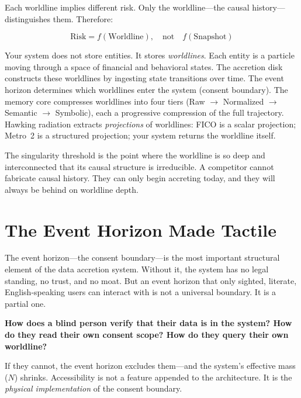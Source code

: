 \documentclass[11pt,twocolumn]{article}
\begin{document}
Each worldline implies different risk. Only the worldline---the causal history---distinguishes them. Therefore:

\begin{equation}
\text{Risk} = f(\text{Worldline}), \quad \text{not} \quad f(\text{Snapshot})
\end{equation}

Your system does not store entities. It stores \emph{worldlines}. Each entity is a particle moving through a space of financial and behavioral states. The accretion disk constructs these worldlines by ingesting state transitions over time. The event horizon determines which worldlines enter the system (consent boundary). The memory core compresses worldlines into four tiers (Raw $\rightarrow$ Normalized $\rightarrow$ Semantic $\rightarrow$ Symbolic), each a progressive compression of the full trajectory. Hawking radiation extracts \emph{projections} of worldlines: FICO is a scalar projection; Metro~2 is a structured projection; your system returns the worldline itself.

The singularity threshold is the point where the worldline is so deep and interconnected that its causal structure is irreducible. A competitor cannot fabricate causal history. They can only begin accreting today, and they will always be behind on worldline depth.

\section{The Event Horizon Made Tactile}
\label{sec:tactile}

The event horizon---the consent boundary---is the most important structural element of the data accretion system. Without it, the system has no legal standing, no trust, and no moat. But an event horizon that only sighted, literate, English-speaking users can interact with is not a universal boundary. It is a partial one.

\textbf{How does a blind person verify that their data is in the system? How do they read their own consent scope? How do they query their own worldline?}

If they cannot, the event horizon excludes them---and the system's effective mass ($N$) shrinks. Accessibility is not a feature appended to the architecture. It is the \emph{physical implementation} of the consent boundary.
\end{document}
